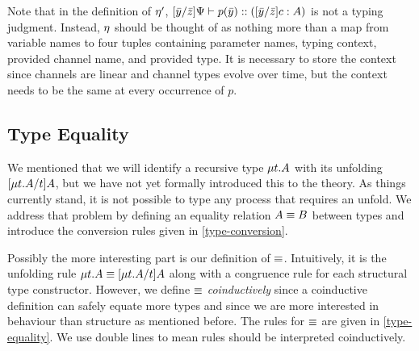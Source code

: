 
Note that in the definition of $\eta'$, $\lbrack{\bar{y}}/{\bar{z}}\rbrack{\Psi} \vdash {p}(\bar{y}) :: (\lbrack{\bar{y}}/{\bar{z}}\rbrack{c} : A)$ is not a typing judgment. Instead, $\eta$ should be thought of as nothing more than a map from variable names to four tuples containing parameter names, typing context, provided channel name, and provided type. It is necessary to store the context since channels are linear and channel types evolve over time, but the context needs to be the same at every occurrence of $p$.


\subsection{Type Equality}
\label{base:type-equality}

We mentioned that we will identify a recursive type $\mu{t} . {A}$ with its unfolding $\lbrack{\mu{t} . {A}}/{t}\rbrack{A}$, but we have not yet formally introduced this to the theory. As things currently stand, it is not possible to type any process that requires an unfold. We address that problem by defining an equality relation $A \equiv B$ between types and introduce the conversion rules given in \cref{type-conversion}.


Possibly the more interesting part is our definition of $\equiv$. Intuitively, it is the unfolding rule $\mu{t} . {A} \equiv \lbrack{\mu{t} . {A}}/{t}\rbrack{A}$ along with a congruence rule for each structural type constructor. However, we define $\equiv$ \emph{coinductively} since a coinductive definition can safely equate more types \cite{StoneS05} and since we are more interested in behaviour than structure as mentioned before. The rules for $\equiv$ are given in \cref{type-equality}. We use double lines to mean rules should be interpreted coinductively.


